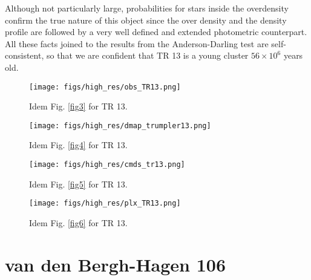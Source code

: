 \documentclass{aa}
\begin{document}
Although not particularly large, probabilities for stars inside the
overdensity confirm the true nature of this object since the over density
and the density profile are followed by a very well defined and extended
photometric counterpart. All these facts joined to the results from the
Anderson-Darling test are self-consistent, so that we are confident that
TR 13 is a young cluster $56\times10^6$ years old.

\begin{figure*}[ht]
    \centering
    \texttt{[image: figs/high\_res/obs\_TR13.png]}
    \caption{Idem Fig. \ref{fig3} for TR 13.}
    \label{fig39}
\end{figure*}
\begin{figure*}[ht]
    \centering
    \texttt{[image: figs/high\_res/dmap\_trumpler13.png]}
    \caption{Idem Fig. \ref{fig4} for TR 13.}
    \label{fig40}
\end{figure*}
\begin{figure*}[ht]
    \centering
    \texttt{[image: figs/high\_res/cmds\_tr13.png]}
    \caption{Idem Fig. \ref{fig5} for TR 13.}
    \label{fig41}
\end{figure*}
\begin{figure*}[ht]
    \centering
    \texttt{[image: figs/high\_res/plx\_TR13.png]}
    \caption{Idem Fig. \ref{fig6} for TR 13.}
    \label{fig42}
\end{figure*}



\section{van den Bergh-Hagen 106}
\end{document}
